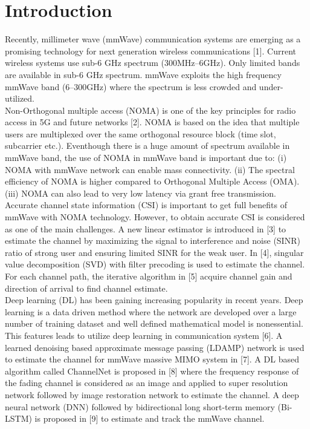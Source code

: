 \documentclass[journal]{IEEEtran}
\begin{document}
\IEEEpeerreviewmaketitle

\section{Introduction}
Recently, millimeter wave (mmWave) communication systems are emerging as a promising technology for next generation wireless communications [1]. Current wireless systems use sub-6 GHz spectrum (300MHz–6GHz). Only limited bands are available in sub-6 GHz spectrum. mmWave exploits the high frequency mmWave band (6–300GHz) where the spectrum is less crowded and under-utilized. \\
Non-Orthogonal multiple access (NOMA) is one of the key principles for radio access in 5G and future networks [2]. NOMA is based on the idea that multiple users are multiplexed over the same orthogonal resource block (time slot, subcarrier etc.). Eventhough there is a huge amount of spectrum available in mmWave band, the use of NOMA in mmWave band is important due to: (i) NOMA with mmWave network can enable mass connectivity. (ii) The spectral efficiency of NOMA is higher compared to Orthogonal Multiple Access (OMA). (iii) NOMA can also lead to very low latency via grant free transmission.\\
Accurate channel state information (CSI) is important to get full benefits of mmWave with NOMA technology. However, to obtain accurate CSI is considered as one of the main challenges. A new linear estimator is introduced in [3] to estimate the channel by maximizing the signal to interference and noise (SINR) ratio of strong user and ensuring limited SINR for the weak user. In [4], singular value decomposition (SVD)  with filter precoding is used to estimate the channel. For each channel path, the iterative algorithm in [5] acquire channel gain and direction of arrival to find channel estimate.\\
Deep learning (DL) has been gaining increasing popularity in recent years. Deep learning is a data driven method where the network are developed over a large number of training dataset and well defined mathematical model is nonessential. This features leads to utilize deep learning in communication system [6]. A learned denoising  based approximate message passing (LDAMP) network is used to estimate the channel for mmWave massive MIMO system in [7]. A DL based algorithm called ChannelNet is proposed in [8] where the frequency response of the fading channel is considered as an image and applied to super resolution network followed by image restoration network to estimate the channel. A deep neural network (DNN) followed by bidirectional long short-term memory (Bi-LSTM) is proposed in [9] to estimate and track the mmWave channel. \\
\end{document}
